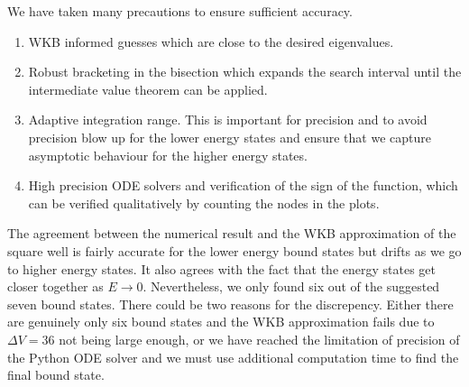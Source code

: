 \documentclass{article}
\begin{document}
We have taken many precautions to ensure sufficient accuracy.
\begin{enumerate}
    \item WKB informed guesses which are close to the desired eigenvalues.
    \item Robust bracketing in the bisection which expands the search interval until the intermediate value theorem can be applied.
    \item Adaptive integration range. This is important for precision and to avoid precision blow up for the lower energy states and ensure that we capture asymptotic behaviour for the higher energy states.
    \item High precision ODE solvers and verification of the sign of the function, which can be verified qualitatively by counting the nodes in the plots.
\end{enumerate}

The agreement between the numerical result and the WKB approximation of the square well is fairly accurate for the lower energy bound states but drifts as we go to higher energy states. It also agrees with the fact that the energy states get closer together as \(E \to 0\). Nevertheless, we only found six out of the suggested seven bound states. There could be two reasons for the discrepency. Either there are genuinely only six bound states and the WKB approximation fails due to \(\Delta V = 36\) not being large enough, or we have reached the limitation of precision of the Python ODE solver and we must use additional computation time to find the final bound state.
\end{document}
